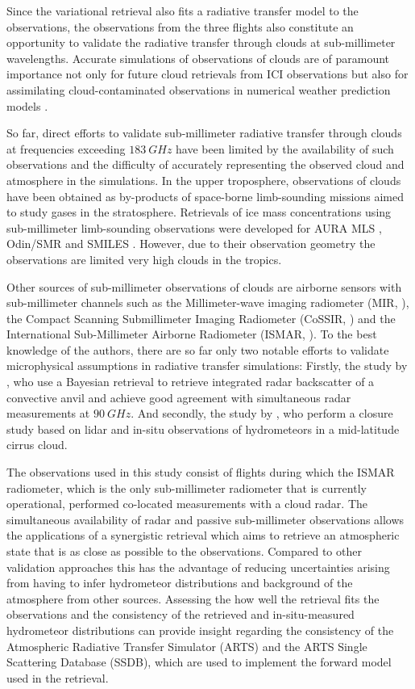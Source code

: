 \documentclass[journal abbreviation, manuscript]{copernicus}
\begin{document}
Since the variational retrieval also fits a radiative transfer model to the
observations, the observations from the three flights also constitute an
opportunity to validate the radiative transfer through clouds at sub-millimeter
wavelengths. Accurate simulations of observations of clouds are of paramount
importance not only for future cloud retrievals from ICI observations
\citep{eriksson20} but also for assimilating cloud-contaminated observations in
numerical weather prediction models \citep{geer17}.

So far, direct efforts to validate sub-millimeter radiative transfer through
clouds at frequencies exceeding $183\ \unit{GHz}$ have been limited by the
availability of such observations and the difficulty of accurately representing
the observed cloud and atmosphere in the simulations. In the upper troposphere,
observations of clouds have been obtained as by-products of space-borne
limb-sounding missions aimed to study gases in the stratosphere. Retrievals of
ice mass concentrations using sub-millimeter limb-sounding observations were
developed for AURA MLS \citep{wu06}, Odin/SMR \citep{eriksson07} and SMILES
\citep{millan13, eriksson14}. However, due to their observation geometry the
observations are limited very high clouds in the tropics.

Other sources of sub-millimeter observations of clouds are airborne sensors with
sub-millimeter channels such as the Millimeter-wave imaging radiometer (MIR,
\citet{wang01}), the Compact Scanning Submillimeter Imaging Radiometer (CoSSIR,
\citet{evans05}) and the International Sub-Millimeter Airborne Radiometer
(ISMAR, \citet{fox17}). To the best knowledge of the authors, there are so far
only two notable efforts to validate microphysical assumptions in radiative
transfer simulations: Firstly, the study by \citet{evans05}, who use a Bayesian
retrieval to retrieve integrated radar backscatter of a convective anvil and
achieve good agreement with simultaneous radar measurements at $90\ \unit{GHz}$.
And secondly, the study by \citet{fox18}, who perform a closure study based on
lidar and in-situ observations of hydrometeors in a mid-latitude cirrus cloud.

The observations used in this study consist of flights during which the ISMAR
radiometer, which is the only sub-millimeter radiometer that is currently
operational, performed co-located measurements with a cloud radar. The
simultaneous availability of radar and passive sub-millimeter observations
allows the applications of a synergistic retrieval which aims to retrieve an
atmospheric state that is as close as possible to the observations. Compared to
other validation approaches this has the advantage of reducing uncertainties
arising from having to infer hydrometeor distributions and background of the
atmosphere from other sources. Assessing the how well the retrieval fits the
observations and the consistency of the retrieved and in-situ-measured
hydrometeor distributions can provide insight regarding the consistency of the
Atmospheric Radiative Transfer Simulator (ARTS) and the ARTS Single Scattering
Database (SSDB), which are used to implement the forward model used in the
retrieval.
\end{document}
